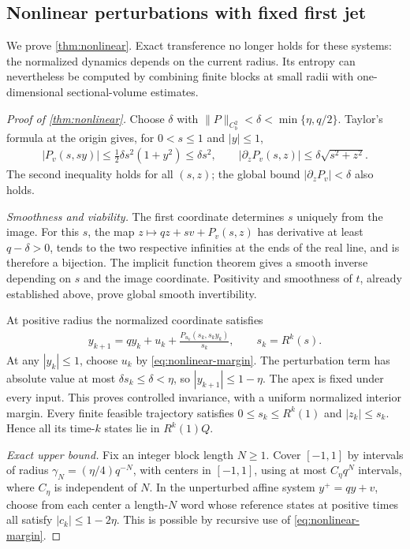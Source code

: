 \documentclass[11pt,a4paper]{article}
\theoremstyle{definition}
\theoremstyle{remark}
\begin{document}
\subsection{Nonlinear perturbations with fixed first jet}

We prove \cref{thm:nonlinear}. Exact transference no longer holds for these systems: the normalized dynamics depends on the current radius. Its entropy can nevertheless be computed by combining finite blocks at small radii with one-dimensional sectional-volume estimates.

\begin{proof}[Proof of \cref{thm:nonlinear}]
Choose \(\delta\) with
\(\|P\|_{C_b^2}<\delta<\min\{\eta,q/2\}\).
Taylor's formula at the origin gives, for \(0<s\leq1\) and \(|y|\leq1\),
\begin{align}\label{eq:perturbation-small}
 |P_v(s,sy)|\leq\tfrac12\delta s^2(1+y^2)\leq\delta s^2,
 \qquad |\partial_zP_v(s,z)|\leq\delta\sqrt{s^2+z^2}.
\end{align}
The second inequality holds for all \((s,z)\); the global bound \(|\partial_zP_v|<\delta\) also holds.

\emph{Smoothness and viability.}
The first coordinate determines \(s\) uniquely from the image. For this \(s\), the map
\(z\mapsto qz+sv+P_v(s,z)\) has derivative at least \(q-\delta>0\), tends to the two respective infinities at the ends of the real line, and is therefore a bijection. The implicit function theorem gives a smooth inverse depending on \(s\) and the image coordinate. Positivity and smoothness of \(t\), already established above, prove global smooth invertibility.

At positive radius the normalized coordinate satisfies
\begin{align}\label{eq:nonlinear-normalized}
 y_{k+1}=qy_k+u_k+
 \frac{P_{u_k}(s_k,s_ky_k)}{s_k},\qquad
 s_k=R^k(s).
\end{align}
At any \(|y_k|\leq1\), choose \(u_k\) by \eqref{eq:nonlinear-margin}. The perturbation term has absolute value at most \(\delta s_k\leq\delta<\eta\), so \(|y_{k+1}|\leq1-\eta\). The apex is fixed under every input. This proves controlled invariance, with a uniform normalized interior margin. Every finite feasible trajectory satisfies \(0\leq s_k\leq R^k(1)\) and \(|z_k|\leq s_k\). Hence all its time-\(k\) states lie in \(R^k(1)Q\).

\emph{Exact upper bound.}
Fix an integer block length \(N\geq1\). Cover \([-1,1]\) by intervals of radius
\(\gamma_N=(\eta/4)q^{-N}\), with centers in \([-1,1]\), using at most \(C_\eta q^N\) intervals, where \(C_\eta\) is independent of \(N\). In the unperturbed affine system \(y^+=qy+v\), choose from each center a length-\(N\) word whose reference states at positive times all satisfy \(|c_k|\leq1-2\eta\). This is possible by recursive use of \eqref{eq:nonlinear-margin}.


\end{proof}
\end{document}
